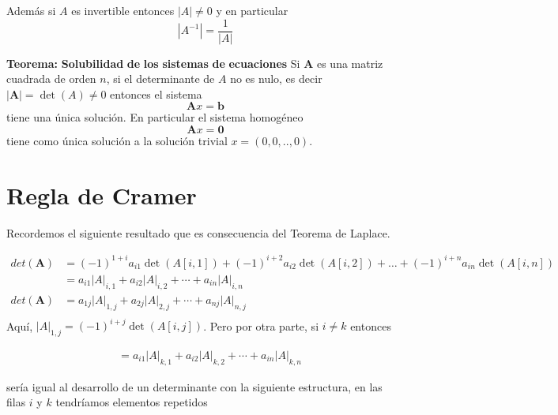 \documentclass[
]{article}
\begin{document}
Además si \(A\) es invertible entonces \(|A|\ne 0\) y en particular
\begin{equation}
|A^{-1}| = \frac{1}{|A|} 
\end{equation}

\textbf{Teorema:} \textbf{Solubilidad} \textbf{de} \textbf{los}
\textbf{sistemas} \textbf{de} \textbf{ecuaciones} Si \(\mathbf{A}\) es
una matriz cuadrada de orden \(n\), si el determinante de \(A\) no es
nulo, es decir \(|\mathbf{A}|=\det(A) \ne 0\) entonces el sistema
\begin{equation}
\mathbf{A}x = \mathbf{b}
\end{equation} tiene una única solución. En particular el sistema
homogéneo \begin{equation}
\mathbf{A}x = \mathbf{0}
\end{equation} tiene como única solución a la solución trivial
\(x=(0,0,..,0)\).

\hypertarget{regla-de-cramer}{%
\section{Regla de Cramer}\label{regla-de-cramer}}

Recordemos el siguiente resultado que es consecuencia del Teorema de
Laplace.

\begin{equation}
\begin{array}{cc}
det(\mathbf{A}) &=  (-1)^{1+i}a_{i1}\det(A[i,1]) +(-1)^{i+2} a_{i2}\det(A[i,2]) + \ldots +(-1)^{i+n} a_{in}\det(A[i,n]) \\
                & = a_{i1}|A|_{i,1}+a_{i2}|A|_{i,2}+ \cdots + a_{in}|A|_{i,n}                         \\
det(\mathbf{A}) &=   a_{1j}|A|_{1,j}+a_{2j}|A|_{2,j}+ \cdots + a_{nj}|A|_{n,j}                         \\
                                   
\end{array}
\end{equation} Aquí, \(|A|_{1,j} = (-1)^{i+j}\det(A[i,j])\). Pero por
otra parte, si \(i\ne k\) entonces

\begin{equation}
\begin{array}{cc}
   &=  a_{i1}|A|_{k,1}+a_{i2}|A|_{k,2}+ \cdots + a_{in}|A|_{k,n}                         
\end{array}
\end{equation}

sería igual al desarrollo de un determinante con la siguiente
estructura, en las filas \(i\) y \(k\) tendríamos elementos repetidos
\end{document}
